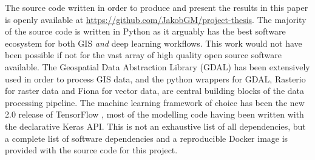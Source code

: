 The source code written in order to produce and present the results in this paper is openly available at \url{https://github.com/JakobGM/project-thesis}.
The majority of the source code is written in Python as it arguably has the best software ecosystem for both GIS \emph{and} deep learning workflows.
This work would not have been possible if not for the vast array of high quality open source software available.
The Geospatial Data Abstraction Library (GDAL) \cite{dep:gdal} has been extensively used in order to process GIS data, and the python wrappers for GDAL, Rasterio \cite{dep:rasterio} for raster data and Fiona \cite{dep:fiona} for vector data, are central building blocks of the data processing pipeline.
The machine learning framework of choice has been the new 2.0 release of TensorFlow \cite{dep:tensorflow}, most of the modelling code having been written with the declarative Keras API.
This is not an exhaustive list of all dependencies, but a complete list of software dependencies and a reproducible Docker \cite{dep:docker} image is provided with the source code for this project.
